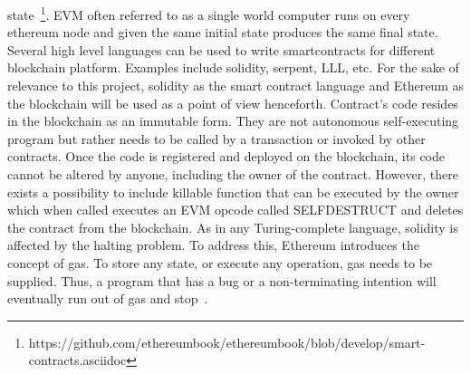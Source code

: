 state~\footnote{https://github.com/ethereumbook/ethereumbook/blob/develop/smart-contracts.asciidoc}.
EVM often referred to as a single world computer runs on every ethereum node
and given the same initial state produces the same final state. Several high
level languages can be used to write smartcontracts for different blockchain
platform. Examples include solidity, serpent, LLL, etc.  For the sake of
relevance to this project, solidity as the smart contract language and Ethereum
as the blockchain will be used as a point of view henceforth. Contract's code
resides in the blockchain as an immutable form.  They are not autonomous
self-executing program but rather needs to be called by a transaction or
invoked by other contracts. Once the code is registered and deployed on the
blockchain, its code cannot be altered by anyone, including the owner of the
contract. However, there exists a possibility to include killable function that
can be executed by the owner which when called executes an EVM opcode called
SELFDESTRUCT and deletes the contract from the blockchain.  As in any
Turing-complete language, solidity is affected by the halting problem.  To
address this, Ethereum introduces the concept of gas. To store any state, or
execute any operation, gas needs to be supplied. Thus, a program that has a bug
or a non-terminating intention will eventually run out of gas and
stop~\cite{whataresmartcontracts}.








